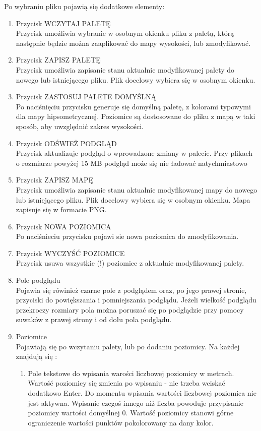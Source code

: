 \documentclass[a4paper]{article}
\begin{document}
Po wybraniu pliku pojawią się dodatkowe elementy:
\begin{enumerate}
\item{Przycisk WCZYTAJ PALETĘ}\\
Przycisk umożliwia wybranie  w osobnym okienku pliku z paletą, którą następnie będzie można zaaplikować do mapy wysokości, lub zmodyfikować.
 
\item{Przycisk ZAPISZ PALETĘ}\\
Przycisk umożliwia zapisanie stanu aktualnie modyfikowanej palety do nowego lub istniejącego pliku. Plik docelowy wybiera się w osobnym okienku.

\item{Przycisk ZASTOSUJ PALETE DOMYŚLNĄ}\\
Po naciśnięciu przycisku generuje się domyślną paletę, z kolorami typowymi dla mapy hipsometrycznej. Poziomice są dostosowane do pliku z mapą w taki sposób, aby uwzględnić zakres wysokości.  

\item{Przycisk ODŚWIEŻ PODGLĄD}\\
Przycisk aktualizuje podgląd o wprowadzone zmiany w palecie. Przy plikach o rozmiarze powyżej 15 MB podgląd może się nie ładować natychmiastowo

\item{Przycisk ZAPISZ MAPĘ}\\
Przycisk umożliwia zapisanie stanu aktualnie modyfikowanej mapy do nowego lub istniejącego pliku. Plik docelowy wybiera się w osobnym okienku. Mapa zapisuje się w formacie PNG.

\item{Przycisk NOWA POZIOMICA}\\
Po naciśnieciu przycisku pojawi sie nowa poziomica do zmodyfikowania.

\item{Przycisk WYCZYŚĆ POZIOMICE}\\
Przycisk usuwa wszystkie (!) poziomice z aktualnie modyfikowanej palety.
 
\item{Pole podglądu}\\
 Pojawia się rówinież czarne pole z podglądem oraz, po jego prawej stronie, przyciski do powiększania i pomniejszania podglądu. Jeżeli wielkość podglądu przekroczy rozmiary pola można poruszać się po podglądzie przy pomocy suwaków z prawej strony i od dołu pola podglądu.
 
\item{Poziomice}\\
 Pojawiają się po wczytaniu palety, lub po dodaniu poziomicy. Na każdej znajdują się :
 	\begin{enumerate}
 	\item{}
 	Pole tekstowe  do wpisania warości liczbowej poziomicy w metrach. Wartość poziomicy się zmienia po wpisaniu - nie trzeba wciskać dodatkowo Enter. Do momentu wpisania wartości liczbowej poziomica nie jest aktywna. Wpisanie czegoś innego niż liczba powoduje przypisanie poziomicy wartości domyślnej 0. Wartość poziomicy stanowi górne ograniczenie wartości punktów pokolorowany na dany kolor.
 	

\end{enumerate}
\end{enumerate}
\end{document}
